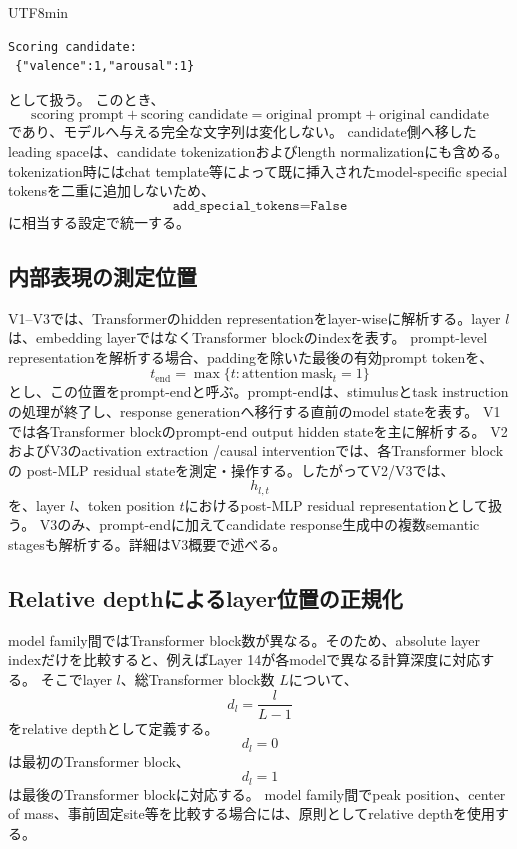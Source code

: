 \documentclass{article} %
\begin{document}
\begin{CJK*}{UTF8}{min}
\begin{verbatim}
Scoring candidate:
 {"valence":1,"arousal":1}
\end{verbatim}
として扱う。
このとき、
\[
\text{scoring prompt}
+
\text{scoring candidate}
=
\text{original prompt}
+
\text{original candidate}
\]
であり、モデルへ与える完全な文字列は変化しない。
candidate側へ移したleading spaceは、candidate tokenizationおよびlength normalizationにも含める。
tokenization時にはchat template等によって既に挿入されたmodel-specific special tokensを二重に追加しないため、
\[
\texttt{add\_special\_tokens=False}
\]
に相当する設定で統一する。


\subsection{内部表現の測定位置}
\label{app:hidden_state_measurement}

V1--V3では、Transformerのhidden representationをlayer-wiseに解析する。layer \(l\) は、embedding layerではなくTransformer blockのindexを表す。
prompt-level representationを解析する場合、paddingを除いた最後の有効prompt tokenを、
\[
t_{\mathrm{end}}
=
\max
\{
t:
\mathrm{attention\ mask}_t=1
\}
\]
とし、この位置をprompt-endと呼ぶ。prompt-endは、stimulusとtask instructionの処理が終了し、response generationへ移行する直前のmodel stateを表す。
V1では各Transformer blockのprompt-end output hidden stateを主に解析する。
V2およびV3のactivation extraction /causal interventionでは、各Transformer blockの
post-MLP residual stateを測定・操作する。したがってV2/V3では、
\[
h_{l,t}
\]
を、layer \(l\)、token position \(t\)におけるpost-MLP residual representationとして扱う。
V3のみ、prompt-endに加えてcandidate response生成中の複数semantic stagesも解析する。詳細はV3概要で述べる。


\subsection{Relative depthによるlayer位置の正規化}
\label{app:relative_depth}

model family間ではTransformer block数が異なる。そのため、absolute layer indexだけを比較すると、例えばLayer 14が各modelで異なる計算深度に対応する。
そこでlayer \(l\)、総Transformer block数 \(L\)について、
\[
d_l
=
\frac{l}{L-1}
\]
をrelative depthとして定義する。
\[
d_l=0
\]
は最初のTransformer block、
\[
d_l=1
\]
は最後のTransformer blockに対応する。
model family間でpeak position、center of mass、事前固定site等を比較する場合には、原則としてrelative depthを使用する。



\end{CJK*}
\end{document}
